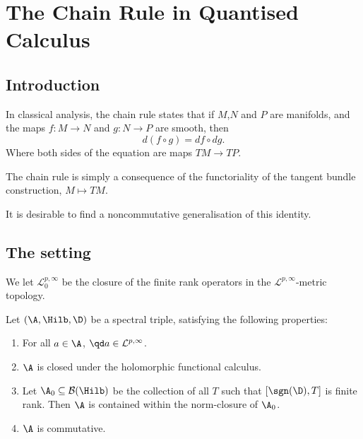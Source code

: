 
\chapter{The Chain Rule in Quantised Calculus} %

\label{TheChainRule} %



\section{Introduction}
In classical analysis, the chain rule states that if $M$,$N$ and $P$ are manifolds, 
 and the maps $f:M\rightarrow N$ and $g:N\rightarrow P$ are smooth, then
\begin{equation*}
    d(f\circ g) = df \circ dg.
\end{equation*}
Where both sides of the equation are maps $TM\rightarrow TP$.

\begin{remark}
    The chain rule is simply a consequence of the functoriality of the tangent
    bundle construction, $M\mapsto TM$.
\end{remark}

 It is desirable
to find a noncommutative generalisation of this identity.


\section{The setting}
We let $\mathcal{L}^{p,\infty}_0$ be the closure of the finite rank
operators in the $\mathcal{L}^{p,\infty}$-metric topology.

Let $(\A,\Hilb,\D)$ be a spectral triple, satisfying the following properties:
\begin{enumerate}
    \item{} For all $a \in \A$, $\qd a \in \mathcal{L}^{p,\infty}$.
    \item{} $\A$ is closed under the holomorphic functional calculus.
    \item{} Let $\A_0 \subseteq \mathcal{B}(\Hilb)$ be the collection of all
    $T$ such that $[\sgn(\D),T]$ is finite rank. Then $\A$ is contained
    within the norm-closure of $\A_0$.
    \item{} $\A$ is commutative.
\end{enumerate}


